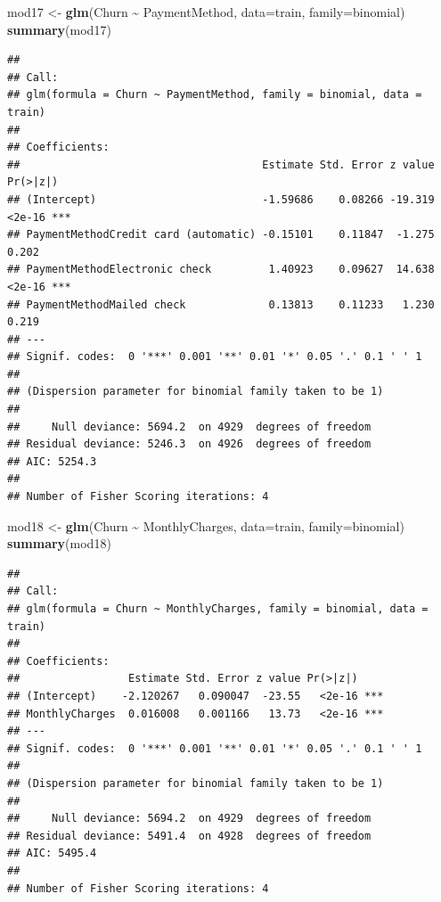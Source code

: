 \documentclass[
  twoside]{article}
\newenvironment{Shaded}{\begin{snugshade}}{\end{snugshade}}
\newcommand{\AttributeTok}[1]{\textcolor[rgb]{0.13,0.29,0.53}{#1}}
\newcommand{\FunctionTok}[1]{\textcolor[rgb]{0.13,0.29,0.53}{\textbf{#1}}}
\newcommand{\NormalTok}[1]{#1}
\newcommand{\OtherTok}[1]{\textcolor[rgb]{0.56,0.35,0.01}{#1}}
\newcommand{\SpecialCharTok}[1]{\textcolor[rgb]{0.81,0.36,0.00}{\textbf{#1}}}
\begin{document}
\begin{Shaded}
\begin{Highlighting}[]
\NormalTok{mod17 }\OtherTok{\textless{}{-}} \FunctionTok{glm}\NormalTok{(Churn }\SpecialCharTok{\textasciitilde{}}\NormalTok{ PaymentMethod, }\AttributeTok{data=}\NormalTok{train, }\AttributeTok{family=}\NormalTok{binomial)}
\FunctionTok{summary}\NormalTok{(mod17)}
\end{Highlighting}
\end{Shaded}

\begin{verbatim}
## 
## Call:
## glm(formula = Churn ~ PaymentMethod, family = binomial, data = train)
## 
## Coefficients:
##                                      Estimate Std. Error z value Pr(>|z|)    
## (Intercept)                          -1.59686    0.08266 -19.319   <2e-16 ***
## PaymentMethodCredit card (automatic) -0.15101    0.11847  -1.275    0.202    
## PaymentMethodElectronic check         1.40923    0.09627  14.638   <2e-16 ***
## PaymentMethodMailed check             0.13813    0.11233   1.230    0.219    
## ---
## Signif. codes:  0 '***' 0.001 '**' 0.01 '*' 0.05 '.' 0.1 ' ' 1
## 
## (Dispersion parameter for binomial family taken to be 1)
## 
##     Null deviance: 5694.2  on 4929  degrees of freedom
## Residual deviance: 5246.3  on 4926  degrees of freedom
## AIC: 5254.3
## 
## Number of Fisher Scoring iterations: 4
\end{verbatim}

\begin{Shaded}
\begin{Highlighting}[]
\NormalTok{mod18 }\OtherTok{\textless{}{-}} \FunctionTok{glm}\NormalTok{(Churn }\SpecialCharTok{\textasciitilde{}}\NormalTok{ MonthlyCharges, }\AttributeTok{data=}\NormalTok{train, }\AttributeTok{family=}\NormalTok{binomial)}
\FunctionTok{summary}\NormalTok{(mod18)}
\end{Highlighting}
\end{Shaded}

\begin{verbatim}
## 
## Call:
## glm(formula = Churn ~ MonthlyCharges, family = binomial, data = train)
## 
## Coefficients:
##                 Estimate Std. Error z value Pr(>|z|)    
## (Intercept)    -2.120267   0.090047  -23.55   <2e-16 ***
## MonthlyCharges  0.016008   0.001166   13.73   <2e-16 ***
## ---
## Signif. codes:  0 '***' 0.001 '**' 0.01 '*' 0.05 '.' 0.1 ' ' 1
## 
## (Dispersion parameter for binomial family taken to be 1)
## 
##     Null deviance: 5694.2  on 4929  degrees of freedom
## Residual deviance: 5491.4  on 4928  degrees of freedom
## AIC: 5495.4
## 
## Number of Fisher Scoring iterations: 4
\end{verbatim}
\end{document}
